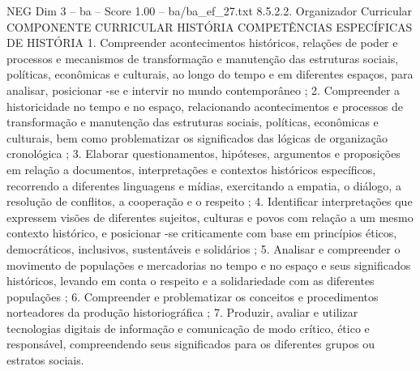 \begin{textsample}{NEG Dim 3 – ba – Score 1.00 – ba/ba\_ef\_27.txt}  \label{ex:f3_neg_115}
8.5.2.2.
Organizador Curricular COMPONENTE CURRICULAR HISTÓRIA COMPETÊNCIAS ESPECÍFICAS DE HISTÓRIA 1.
Compreender acontecimentos históricos, relações de poder e processos e mecanismos de transformação e manutenção das estruturas sociais, políticas, econômicas e culturais, ao longo do tempo e em diferentes espaços, para analisar, posicionar -se e intervir no mundo contemporâneo ; 2.
Compreender a historicidade no tempo e no espaço, relacionando acontecimentos e processos de transformação e manutenção das estruturas sociais, políticas, econômicas e culturais, bem como problematizar os significados das lógicas de organização cronológica ; 3.
Elaborar questionamentos, hipóteses, argumentos e proposições em relação a documentos, interpretações e contextos históricos específicos, recorrendo a diferentes linguagens e mídias, exercitando a empatia, o diálogo, a resolução de conflitos, a cooperação e o respeito ; 4.
Identificar interpretações que expressem visões de diferentes sujeitos, culturas e povos com relação a um mesmo contexto histórico, e posicionar -se criticamente com base em princípios éticos, democráticos, inclusivos, sustentáveis e solidários ; 5.
Analisar e compreender o movimento de populações e mercadorias no tempo e no espaço e seus significados históricos, levando em conta o respeito e a solidariedade com as diferentes populações ; 6.
Compreender e problematizar os conceitos e procedimentos norteadores da produção historiográfica ; 7.
Produzir, avaliar e utilizar tecnologias digitais de informação e comunicação de modo crítico, ético e responsável, compreendendo seus significados para os diferentes grupos ou estratos sociais.

\end{textsample}
